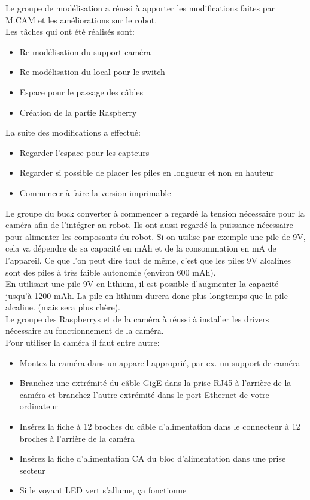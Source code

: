 \documentclass{PackagerQualityN}
\begin{document}
Le groupe de modélisation a réussi à apporter les modifications faites par M.CAM et les améliorations sur le robot.\\

Les tâches qui ont été réalisés sont:
\begin{itemize}
    \item Re modélisation du support caméra
    \item Re modélisation du local pour le switch
    \item Espace pour le passage des câbles
    \item Création de la partie Raspberry\\
\end{itemize}

La suite des modifications a effectué:
 \begin{itemize}
     \item Regarder l’espace pour les capteurs
     \item Regarder si possible de placer les piles en longueur et non en hauteur
     \item Commencer à faire la version imprimable\\
 \end{itemize}
 
 Le groupe du buck converter à commencer a regardé la tension nécessaire pour la caméra afin de l'intégrer au robot. Ils ont aussi regardé la puissance nécessaire pour alimenter les composants du robot.  Si on utilise par exemple une pile de 9V, cela va dépendre de sa capacité en mAh et de la consommation en mA de l’appareil. Ce que l’on peut dire tout de même, c’est que les piles 9V alcalines sont des piles à très faible autonomie (environ 600 mAh). \\
 
En utilisant une pile 9V en lithium, il est possible d’augmenter la capacité jusqu’à 1200 mAh. La pile en lithium durera donc plus longtemps que la pile alcaline. (mais sera plus chère).
 \\
 
Le groupe des Raspberrys et de la caméra à réussi à installer les drivers nécessaire au fonctionnement de la caméra.\\
 
Pour utiliser la caméra il faut entre autre:
\begin{itemize}
    \item Montez la caméra dans un appareil approprié, par ex. un support de caméra
    \item Branchez une extrémité du câble GigE dans la prise RJ45 à l'arrière de la caméra et branchez l'autre extrémité dans le port Ethernet de votre ordinateur
    \item Insérez la fiche à 12 broches du câble d'alimentation dans le connecteur à 12 broches à l'arrière de la caméra
    \item Insérez la fiche d'alimentation CA du bloc d'alimentation dans une prise secteur
    \item Si le voyant LED vert s'allume, ça fonctionne
\end{itemize}
\end{document}
